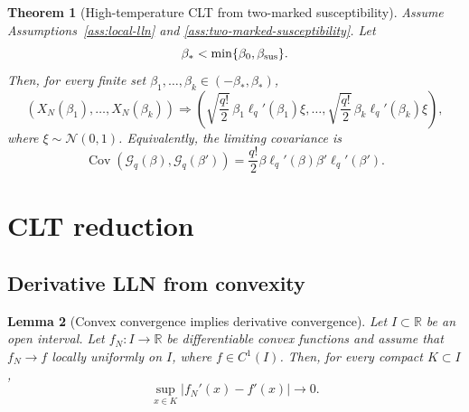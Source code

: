 \documentclass[11pt]{article}
\newtheorem{theorem}{Theorem}[section]
\newtheorem{lemma}[theorem]{Lemma}
\newcommand{\Cov}{\operatorname{Cov}}
\newcommand{\N}{\mathcal{N}}
\newcommand{\R}{\mathbb{R}}
\newcommand{\calG}{\mathcal{G}}
\begin{document}
\begin{theorem}[High-temperature CLT from two-marked susceptibility]
  \label{thm:main-clt}
  Assume Assumptions~\ref{ass:local-lln} and
  \ref{ass:two-marked-susceptibility}.  Let
  \begin{equation}\label{eq:beta-star}
    \beta_*<\min\{\beta_0,\beta_{\rm sus}\}.
  \end{equation}
  Then, for every finite set $\beta_1,\ldots,\beta_k\in(-\beta_*,\beta_*)$,
  \begin{equation}\label{eq:fdd-clt}
    (X_N(\beta_1),\ldots,X_N(\beta_k))
    \Rightarrow
    \left(
      \sqrt{\frac{q!}{2}}\,\beta_1\ell_q'(\beta_1)\xi,
      \ldots,
      \sqrt{\frac{q!}{2}}\,\beta_k\ell_q'(\beta_k)\xi
    \right),
  \end{equation}
  where $\xi\sim\N(0,1)$.  Equivalently, the limiting covariance is
  \begin{equation}\label{eq:limit-covariance}
    \Cov(\calG_q(\beta),\calG_q(\beta'))
    =
    \frac{q!}{2}\beta\ell_q'(\beta)\beta'\ell_q'(\beta').
  \end{equation}
\end{theorem}

\section{CLT reduction}
\label{sec:clt-reduction}

\subsection{Derivative LLN from convexity}

\begin{lemma}[Convex convergence implies derivative convergence]
  \label{lem:convex-derivative}
  Let $I\subset\R$ be an open interval.  Let $f_N:I\to\R$ be differentiable
  convex functions and assume that $f_N\to f$ locally uniformly on $I$, where
  $f\in C^1(I)$.  Then, for every compact $K\subset I$,
  \begin{equation}\label{eq:convex-derivative-conclusion}
    \sup_{x\in K}|f_N'(x)-f'(x)|\to0.
  \end{equation}
\end{lemma}
\end{document}
